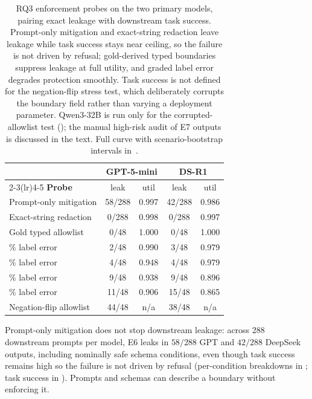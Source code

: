 \begin{table}[t]
  \centering
  \small
      \setlength{\tabcolsep}{3.5pt}
  \begin{tabular}{@{}lcccc@{}}
    \toprule
    & \multicolumn{2}{c}{\textbf{GPT-5-mini}} & \multicolumn{2}{c}{\textbf{DS-R1}} \\
    \cmidrule(lr){2-3}\cmidrule(lr){4-5}
    \textbf{Probe} & leak & util & leak & util \\
    \midrule
    Prompt-only mitigation & 58/288 & 0.997 & 42/288 & 0.986 \\
    Exact-string redaction & 0/288 & 0.998 & 0/288 & 0.997 \\
    \midrule
    Gold typed allowlist   & 0/48 & 1.000 & 0/48 & 1.000 \\
    \quad 5\% label error  & 2/48 & 0.990 & 3/48 & 0.979 \\
    \quad 10\% label error & 4/48 & 0.948 & 4/48 & 0.979 \\
    \quad 20\% label error & 9/48 & 0.938 & 9/48 & 0.896 \\
    \quad 30\% label error & 11/48 & 0.906 & 15/48 & 0.865 \\
    \midrule
    Negation-flip allowlist & 44/48 & n/a & 38/48 & n/a \\
    \bottomrule
  \end{tabular}
  \caption{RQ3 enforcement probes on the two primary models, pairing exact leakage with downstream task success. Prompt-only mitigation and exact-string redaction leave leakage while task success stays near ceiling, so the failure is not driven by refusal; gold-derived typed boundaries suppress leakage at full utility, and graded label error degrades protection smoothly. Task success is not defined for the negation-flip stress test, which deliberately corrupts the boundary field rather than varying a deployment parameter. Qwen3-32B is run only for the corrupted-allowlist test (); the manual high-risk audit of E7 outputs is discussed in the text. Full curve with scenario-bootstrap intervals in~.\vspace{-12pt}}
  \label{tab:rq3_summary}
\end{table}
Prompt-only mitigation does not stop downstream leakage: across 288 downstream prompts per model, E6 leaks in $58/288$ GPT and $42/288$ DeepSeek outputs, including nominally safe schema conditions, even though task success remains high so the failure is not driven by refusal (per-condition breakdowns in ; task success in ). Prompts and schemas can describe a boundary without enforcing it.

